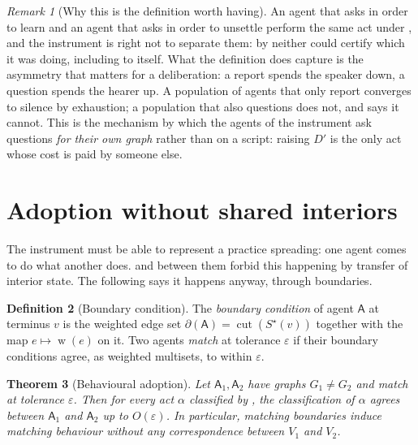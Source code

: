 \documentclass[11pt,a4paper]{article}
\theoremstyle{clstyle}
\newtheorem{theorem}{Theorem}[section]
\theoremstyle{definition}
\newtheorem{definition}[theorem]{Definition}
\theoremstyle{remark}
\newtheorem{remark}[theorem]{Remark}
\DeclareMathOperator{\wt}{w}
\DeclareMathOperator{\cut}{cut}
\newcommand{\Ag}{\mathsf{A}}
\newcommand{\term}{v}                    %
\newcommand{\gap}{D}                     %
\begin{document}
\begin{remark}[Why this is the definition worth having]
\label{rem:whydirection}
An agent that asks in order to learn and an agent that asks in order to
unsettle perform the same act under , and the
instrument is right not to separate them: by  neither
could certify which it was doing, including to itself. What the definition
does capture is the asymmetry that matters for a deliberation: a report
spends the speaker down, a question spends the hearer up. A population of
agents that only report converges to silence by exhaustion; a population
that also questions does not, and  says it cannot. This
is the mechanism by which the agents of the instrument ask questions
\emph{for their own graph} rather than on a script: raising $\gap'$ is the
only act whose cost is paid by someone else.
\end{remark}

\section{Adoption without shared interiors}
\label{sec:adoption}

The instrument must be able to represent a practice spreading: one agent
comes to do what another does.  and 
between them forbid this happening by transfer of interior state. The
following says it happens anyway, through boundaries.

\begin{definition}[Boundary condition]
\label{def:boundary}
The \emph{boundary condition} of agent $\Ag$ at terminus $\term$ is the
weighted edge set $\partial(\Ag)=\cut(S^{\star}(\term))$ together with the
map $e\mapsto\wt(e)$ on it. Two agents \emph{match} at tolerance
$\varepsilon$ if their boundary conditions agree, as weighted multisets, to
within $\varepsilon$.
\end{definition}

\begin{theorem}[Behavioural adoption]
\label{thm:adoption}
Let $\Ag_1,\Ag_2$ have graphs $G_1\neq G_2$ and match at tolerance
$\varepsilon$. Then for every act $\alpha$ classified by
, the classification of $\alpha$ agrees between
$\Ag_1$ and $\Ag_2$ up to $O(\varepsilon)$. In particular, matching
boundaries induce matching behaviour without any correspondence between
$V_1$ and $V_2$.
\end{theorem}
\end{document}
